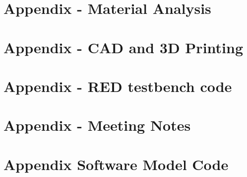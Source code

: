 \documentclass[12pt,a4paper]{scrreprt}
\begin{document}
\chapter{Appendix - Material Analysis}
\label{app:AppendixD}


\chapter{Appendix - CAD and 3D Printing}
\label{app:AppendixE}



\chapter{Appendix - \acf{RED} testbench code}
\label{app:AppendixF}


\chapter{Appendix - Meeting Notes}
\label{app:AppendixG}


\chapter{Appendix Software Model Code}
\label{app:Software Model - Code}

\end{document}
